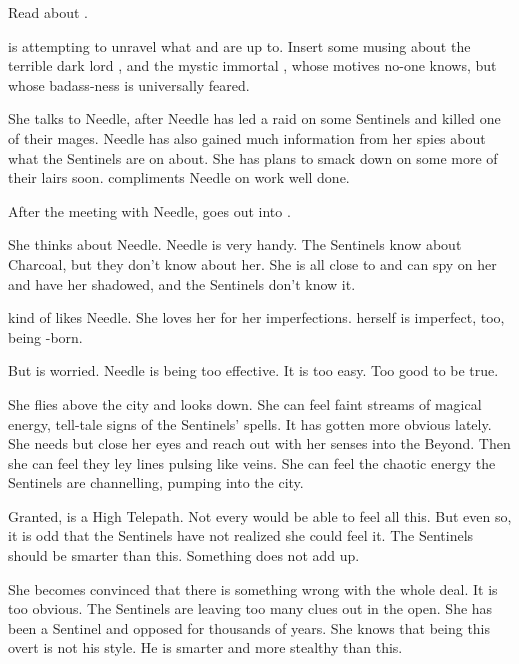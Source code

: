 

Read about \Forclin. 



\begin{comment}
  \section{Achsah suspects}
\end{comment}

\Achsah{} is attempting to unravel what \Ishnaruchaefir{} and \Secherdamon{} are up to. 
Insert some musing about the terrible dark lord \Secherdamon, and the mystic immortal \Ishna, whose motives no-one knows, but whose badass-ness is universally feared. 

She talks to Needle, after Needle has led a raid on some Sentinels and killed one of their mages. 
Needle has also gained much information from her spies about what the Sentinels are on about. 
She has plans to smack down on some more of their lairs soon. 
\Achsah compliments Needle on work well done. 

After the meeting with Needle, \Achsah goes out into \Malcur. 

She thinks about Needle. 
Needle is very handy. 
The Sentinels know about Charcoal, but they don't know about her. 
She is all close to \Tiroco{} and can spy on her and have her shadowed, and the Sentinels don't know it. 

\Achsah{} kind of likes Needle. 
She loves her for her imperfections. 
\Achsah{} herself is imperfect, too, being \bezed-born. 

But \Achsah is worried. 
Needle is being too effective. 
It is too easy. 
Too good to be true. 

She flies above the city and looks down. 
She can feel faint streams of magical energy, tell-tale signs of the Sentinels' spells. 
It has gotten more obvious lately. 
She needs but close her eyes and reach out with her senses into the Beyond. 
Then she can feel they ley lines pulsing like veins. 
She can feel the chaotic energy the Sentinels are channelling, pumping into the city. 

Granted, \Achsah is a High Telepath. 
Not every \resphan would be able to feel all this. 
But even so, it is odd that the Sentinels have not realized she could feel it. 
The Sentinels should be smarter than this. 
Something does not add up. 

She becomes convinced that there is something wrong with the whole \Malcur deal. 
It is too obvious. 
The Sentinels are leaving too many clues out in the open.
She has been a Sentinel and opposed \Secherdamon{} for thousands of years. 
She knows that being this overt is not his style. 
He is smarter and more stealthy than this. 


